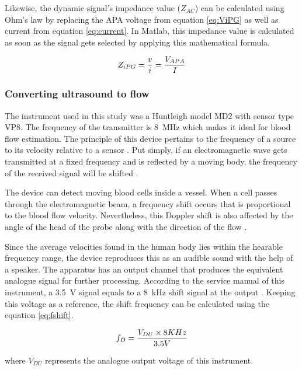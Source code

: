 Likewise, the dynamic signal's impedance value ($Z_{AC}$) can be calculated using Ohm's law \cite{ohm1827galvanische} by replacing the APA voltage from equation \ref{eq:ViPG} as well as current from equation \ref{eq:current}. In Matlab, this impedance value is calculated as soon as the signal gets selected by applying this mathematical formula.

\begin{align}
	\label{eq:zipg}
	Z_{iPG}=\frac{v}{i} = \frac{V_{APA}}{I} \tagaddtext{[\si{\ohm}]}
\end{align}

\subsubsection{Converting ultrasound to flow}
\label{sectionDU}
The instrument used in this study was a Huntleigh model MD2 with sensor type VP8. The frequency of the transmitter is \SI{8}{\mega\hertz} which makes it ideal for blood flow estimation. The principle of this device pertains to the frequency of a source to its velocity relative to a sensor \cite{surgeonhand2002Hand}. Put simply, if an electromagnetic wave gets transmitted at a fixed frequency and is reflected by a moving body, the frequency of the received signal will be shifted \cite{ht:MD2}.  

The device can detect moving blood cells inside a vessel. When a cell passes through the electromagnetic beam, a frequency shift occurs that is proportional to the blood flow velocity. Nevertheless, this Doppler shift is also affected by the angle of the head of the probe along with the direction of the flow \cite{surgeonhand2002Hand}.

Since the average velocities found in the human body lies within the hearable frequency range, the device reproduces this as an audible sound with the help of a speaker. The apparatus has an output channel that produces the equivalent analogue signal for further processing. According to the service manual of this instrument, a \SI{3.5}{\volt} signal equals to a \SI{8}{\kilo\hertz} shift signal at the output \cite{ht:MD2}. Keeping this voltage as a reference, the shift frequency can be calculated using the equation \ref{eq:fshift}.

\begin{align}
	\label{eq:fshift}
	f_D = \frac{V_{DU} \times 8 KHz}{3.5V} \tagaddtext{[\si{\hertz}]}
\end{align}  

where $V_{DU}$ represents the analogue output voltage of this instrument. 

